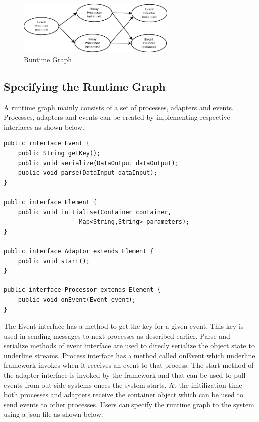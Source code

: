 \begin{figure}[!t]
        \centering
        \includegraphics[width=3.0in]{runtimegraph.png}
        \caption{Runtime Graph}
        \label{runtimegraph}
\end{figure}

\subsection{Specifying the Runtime Graph}

A runtime graph mainly consists of a set of processes, adapters and events. Processes, adapters and events can be created by implementing respective interfaces as shown below.



\begin{lstlisting}
public interface Event {
    public String getKey();
    public void serialize(DataOutput dataOutput);
    public void parse(DataInput dataInput);
}

public interface Element {
    public void initialise(Container container,
                     Map<String,String> parameters);
}

public interface Adaptor extends Element {
    public void start();
}

public interface Processor extends Element {
    public void onEvent(Event event);
}
\end{lstlisting}

 The Event interface has a method to get the key for a given event. This key is used in sending messages to next processes as described earlier. Parse and serialize methods of event interface are used to direcly serialize the object state to underline streams. Process interface has a method called onEvent which underline framework invokes when it receives an event to that process. The start method of the adapter interface is invoked by the framework and that can be used to pull events from out side systems onces the system starts. At the initilization time both processes and adapters receive the container object which can be used to send events to other processes. Users can specify the runtime graph to the system using a json file as shown below. 

